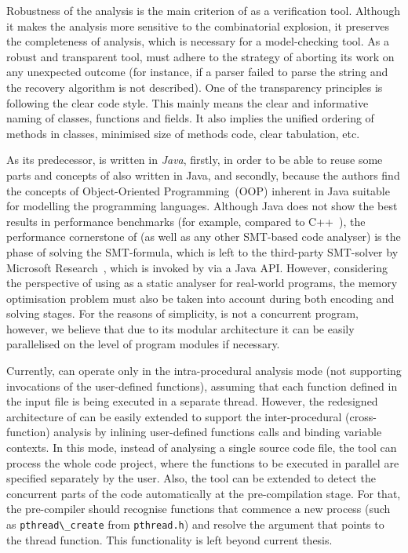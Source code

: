 Robustness of the analysis is the main criterion of \porthos[2] as a verification tool.
Although it makes the analysis more sensitive to the combinatorial explosion, it preserves the completeness of analysis, which is necessary for a model-checking tool.
As a robust and transparent tool, \porthos[2] must adhere to the strategy of aborting its work on any unexpected outcome (for instance, if a parser failed to parse the string and the recovery algorithm is not described).
One of the transparency principles is following the clear code style.
This mainly means the clear and informative naming of classes, functions and fields.
It also implies the unified ordering of methods in classes, minimised size of methods code, clear tabulation, etc.

As its predecessor, \porthos[2] is written in \textit{Java}, firstly, in order to be able to reuse some parts and concepts of \porthos{} also written in Java, and secondly, because the authors find the concepts of Object-Oriented Programming~(OOP) inherent in Java suitable for modelling the programming languages.
Although Java does not show the best results in performance benchmarks (for example, compared to C++~\cite{hundt2011loop}), the performance cornerstone of \porthos[2] (as well as any other SMT-based code analyser) is the phase of solving the SMT-formula, which is left to the third-party SMT-solver %
%
by Microsoft Research~\cite{de2008z3}, which is invoked by \porthos[2] via a Java API.
%
However, considering the perspective of using \porthos[2] as a static analyser for real-world programs, the memory optimisation problem must also be taken into account during both encoding and solving stages.
For the reasons of simplicity, \porthos[2] is not a concurrent program, however, we believe that due to its modular architecture it can be easily parallelised on the level of program modules if necessary.

Currently, \porthos[2] can operate only in the intra-procedural analysis mode (not supporting invocations of the user-defined functions), assuming that each function defined in the input file is being executed in a separate thread.
However, the redesigned architecture of \porthos[2] can be easily extended to support the inter-procedural (cross-function) analysis by inlining user-defined functions calls and binding variable contexts.
In this mode, instead of analysing a single source code file, the tool can process the whole code project, where the functions to be executed in parallel are specified separately by the user.
Also, the tool can be extended to detect the concurrent parts of the code automatically at the pre-compilation stage.
For that, the pre-compiler should recognise functions that commence a new process (such as \lstinline{pthread\_create} from \texttt{pthread.h}) and resolve the argument that points to the thread function.
This functionality is left beyond current thesis.


